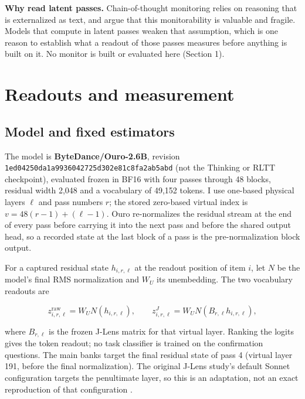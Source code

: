 \textbf{Why read latent passes.} Chain-of-thought monitoring relies on
reasoning that is externalized as text, and
\citet{korbak2025monitorability} argue that this monitorability is
valuable and fragile. Models that compute in latent passes weaken that
assumption, which is one reason to establish what a readout of those
passes measures before anything is built on it. No monitor is built or
evaluated here (Section 1).

\section{Readouts and measurement}\label{readouts-and-measurement}

\subsection{Model and fixed
estimators}\label{model-and-fixed-estimators}

The model is \textbf{ByteDance/Ouro-2.6B}, revision
\texttt{1ed04250da1a9936042725d302e81c8fa2ab5abd} (not the Thinking or
RLTT checkpoint), evaluated frozen in BF16 with four passes through 48
blocks, residual width 2,048 and a vocabulary of 49,152 tokens. I use
one-based physical layers \(\ell\) and pass numbers \(r\); the stored
zero-based virtual index is \(v = 48(r-1) + (\ell-1)\). Ouro
re-normalizes the residual stream at the end of every pass before
carrying it into the next pass and before the shared output head, so a
recorded state at the last block of a pass is the pre-normalization
block output.

For a captured residual state \(h_{i,r,\ell}\) at the readout position
of item \(i\), let \(N\) be the model's final RMS normalization and
\(W_U\) its unembedding. The two vocabulary readouts are

\[
z^{\mathrm{raw}}_{i,r,\ell}=W_U N(h_{i,r,\ell}), \qquad
z^{J}_{i,r,\ell}=W_U N(B_{r,\ell}h_{i,r,\ell}),
\]

where \(B_{r,\ell}\) is the frozen J-Lens matrix for that virtual layer.
Ranking the logits gives the token readout; no task classifier is
trained on the confirmation questions. The main banks target the final
residual state of pass 4 (virtual layer 191, before the final
normalization). The original J-Lens study's default Sonnet configuration
targets the penultimate layer, so this is an adaptation, not an exact
reproduction of that configuration \citep{gurnee2026workspace}.

